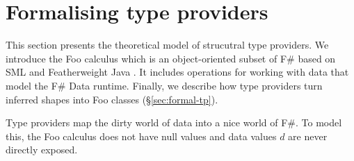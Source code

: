 \documentclass[10pt,preprint,blind,clearpagebib]{sigplanconf}
\newcommand{\kvd}[1]{\textnormal{\textcolor{kvdclr}{\sffamily #1}}}
\begin{document}
\section{Formalising type providers}
\label{sec:formal}

This section presents the theoretical model of strucutral type providers. We introduce the Foo calculus 
which is an object-oriented subset of F\# based on SML \cite{sml} and Featherweight Java \cite{fwjava}. It 
includes operations for working with data that model the F\# Data runtime. Finally, we describe how 
type providers turn inferred shapes into Foo classes (\S\ref{sec:formal-tp}).

Type providers map the dirty world of data into a nice world of F\#. To model this, the Foo calculus
does not have \kvd{null} values and data values $d$ are never directly exposed.

\end{document}
